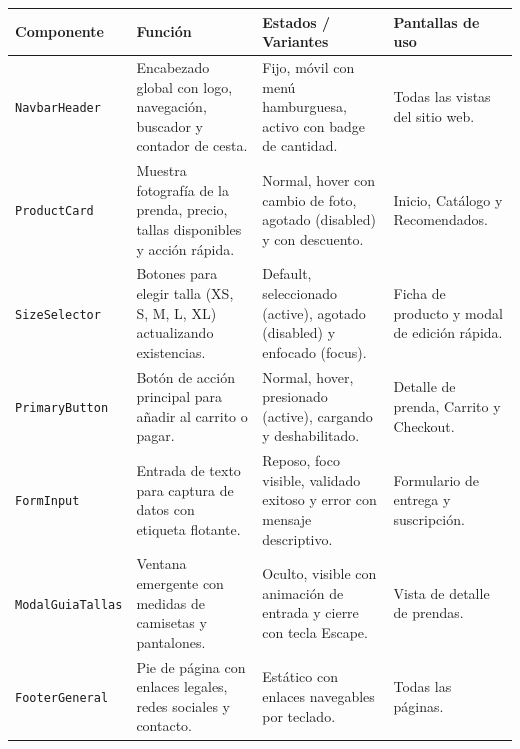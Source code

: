\documentclass[12pt]{article}
\begin{document}
\begin{table}[H]
\centering
\small
\renewcommand{\arraystretch}{1.3}
\begin{tabularx}{\textwidth}{|>{\raggedright\arraybackslash}p{}|>{\raggedright\arraybackslash}p{}|>{\raggedright\arraybackslash}p{}|X|}
\hline
\textbf{Componente} & \textbf{Función} & \textbf{Estados / Variantes} & \textbf{Pantallas de uso} \\ \hline
\texttt{NavbarHeader} & Encabezado global con logo, navegación, buscador y contador de cesta. & Fijo, móvil con menú hamburguesa, activo con badge de cantidad. & Todas las vistas del sitio web. \\ \hline
\texttt{ProductCard} & Muestra fotografía de la prenda, precio, tallas disponibles y acción rápida. & Normal, hover con cambio de foto, agotado (disabled) y con descuento. & Inicio, Catálogo y Recomendados. \\ \hline
\texttt{SizeSelector} & Botones para elegir talla (XS, S, M, L, XL) actualizando existencias. & Default, seleccionado (active), agotado (disabled) y enfocado (focus). & Ficha de producto y modal de edición rápida. \\ \hline
\texttt{PrimaryButton} & Botón de acción principal para añadir al carrito o pagar. & Normal, hover, presionado (active), cargando y deshabilitado. & Detalle de prenda, Carrito y Checkout. \\ \hline
\texttt{FormInput} & Entrada de texto para captura de datos con etiqueta flotante. & Reposo, foco visible, validado exitoso y error con mensaje descriptivo. & Formulario de entrega y suscripción. \\ \hline
\texttt{ModalGuiaTallas} & Ventana emergente con medidas de camisetas y pantalones. & Oculto, visible con animación de entrada y cierre con tecla Escape. & Vista de detalle de prendas. \\ \hline
\texttt{FooterGeneral} & Pie de página con enlaces legales, redes sociales y contacto. & Estático con enlaces navegables por teclado. & Todas las páginas. \\ \hline
\end{tabularx}
\end{table}
\end{document}
